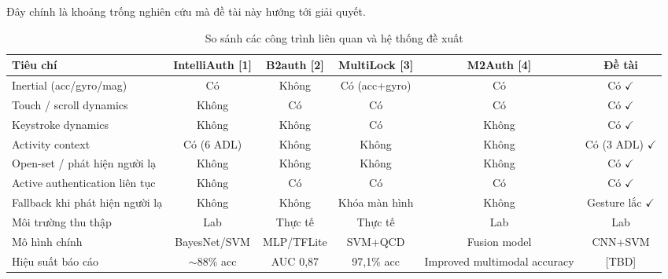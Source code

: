 \documentclass[../DoAn.tex]{subfiles}
\begin{document}
    Đây chính là khoảng trống nghiên cứu mà đề tài này hướng tới giải quyết.
    
    \begin{table}[H]
    \centering
    \caption{So sánh các công trình liên quan và hệ thống đề xuất}
    \label{tab:related_work_compare}
    \renewcommand{\arraystretch}{1.3}
    \begin{tabular}{|p{4cm}|c|c|c|c|c|}
    \hline
    \textbf{Tiêu chí} & \textbf{IntelliAuth [1]} & \textbf{B2auth [2]} & \textbf{MultiLock [3]} & \textbf{M2Auth [4]} & \textbf{Đề tài} \\
    \hline
    
    Inertial (acc/gyro/mag) 
    & Có 
    & Không 
    & Có (acc+gyro) 
    & Có 
    & Có $\checkmark$ \\
    \hline
    
    Touch / scroll dynamics 
    & Không 
    & Có 
    & Có 
    & Có 
    & Có $\checkmark$ \\
    \hline
    
    Keystroke dynamics 
    & Không 
    & Không 
    & Có 
    & Không 
    & Có $\checkmark$ \\
    \hline
    
    Activity context 
    & Có (6 ADL) 
    & Không 
    & Không 
    & Không 
    & Có (3 ADL) $\checkmark$ \\
    \hline
    
    Open-set / phát hiện người lạ 
    & Không 
    & Không 
    & Không 
    & Không 
    & Có $\checkmark$ \\
    \hline
    
    Active authentication liên tục 
    & Không 
    & Có 
    & Có 
    & Có 
    & Có $\checkmark$ \\
    \hline
    
    Fallback khi phát hiện người lạ 
    & Không 
    & Không 
    & Khóa màn hình 
    & Không 
    & Gesture lắc $\checkmark$ \\
    \hline
    
    Môi trường thu thập 
    & Lab 
    & Thực tế 
    & Thực tế 
    & Lab 
    & Lab \\
    \hline
    
    Mô hình chính 
    & BayesNet/SVM 
    & MLP/TFLite 
    & SVM+QCD 
    & Fusion model 
    & CNN+SVM \\
    \hline
    
    Hiệu suất báo cáo 
    & $\sim$88\% acc 
    & AUC 0,87 
    & 97,1\% acc 
    & Improved multimodal accuracy 
    & [TBD] \\
    \hline
    
    \end{tabular}
    \end{table}
    
\end{document}
